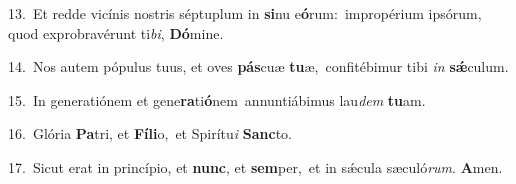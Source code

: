 {\numbfont\textcolor{\numbcolor}{13.}}~Et redde vicínis nostris séptuplum in \textbf{si}\-nu e\-\textbf{ó}\-rum:~\star impropérium ipsórum, quod exprobravérunt ti\-\textit{bi}\-, \textbf{Dó}\-mine.\par
{\numbfont\textcolor{\numbcolor}{14.}}~Nos autem pópulus tuus, et oves \textbf{pás}\-cuæ \textbf{tu}\-æ,~\star confitébimur tibi \textit{in} \textbf{sǽ}\-culum.\par
{\numbfont\textcolor{\numbcolor}{15.}}~In generatiónem et gene\-\textbf{ra}\-ti\-\textbf{ó}\-nem~\star annuntiábimus lau\textit{dem} \textbf{tu}\-am.\par
{\numbfont\textcolor{\numbcolor}{16.}}~Glória \textbf{Pa}\-tri, et \textbf{Fí}\-\textbf{li}o,~\star et Spirítu\textit{i} \textbf{Sanc}\-to.\par
{\numbfont\textcolor{\numbcolor}{17.}}~Sicut erat in princípio, et \textbf{nunc}\-, et \textbf{sem}\-per,~\star et in sǽcula sæculó\-\textit{rum}\-. \textbf{A}\-men.\par
